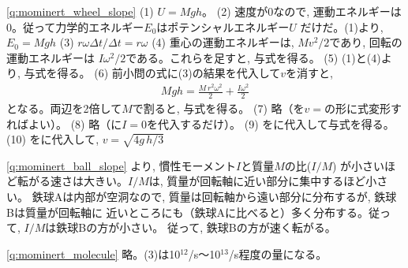 \begin{q}
\ref{q:mominert_wheel_slope}
(1) $U=Mgh$。
(2) 速度が0なので, 運動エネルギーは0。従って力学的エネルギー$E_0$はポテンシャルエネルギー$U$
だけだ。(1)より, $E_0=Mgh$
(3) $r\omega\Delta t/\Delta t=r\omega$
(4) 重心の運動エネルギーは, 
$Mv^2/2$であり, 回転の運動エネルギーは
$I\omega^2/2$である。これらを足すと, 与式を得る。
(5) (1)と(4)より, 与式を得る。
(6) 前小問の式に(3)の結果を代入して$v$を消すと, 
\begin{eqnarray}
Mgh=\frac{M\,r^2\omega^2}{2}+\frac{I\omega^2}{2}
\end{eqnarray}
となる。両辺を2倍して$M$で割ると, 与式を得る。
(7) 略（を$v=$の形に式変形すればよい）。
(8) 略（に$I=0$を代入するだけ）。
(9) をに代入して与式を得る。
(10) をに代入して, 
$v=\sqrt{4g\,h/3}$
\mv

\ref{q:mominert_ball_slope}
より, 慣性モーメント$I$と質量$M$の比($I/M$)
が小さいほど転がる速さは大きい。$I/M$は, 質量が回転軸に近い部分に集中するほど小さい。
鉄球Aは内部が空洞なので, 質量は回転軸から遠い部分に分布するが, 鉄球Bは質量が回転軸に
近いところにも（鉄球Aに比べると）多く分布する。従って, $I/M$は鉄球Bの方が小さい。
従って, 鉄球Bの方が速く転がる。\mv


\ref{q:mominert_molecule} 略。(3)は10$^{12}$/s〜10$^{13}$/s程度の量になる。
\mv


\end{q}
